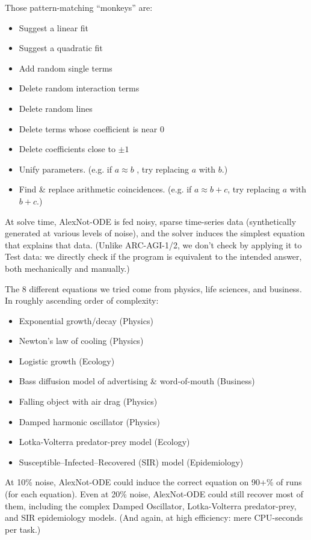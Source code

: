 \documentclass[11pt]{article}
\begin{document}
Those pattern-matching ``monkeys'' are:

\begin{itemize}
    \item Suggest a linear fit
    \item Suggest a quadratic fit
    \item Add random single terms
    \item Delete random interaction terms
    \item Delete random lines
    \item Delete terms whose coefficient is near 0
    \item Delete coefficients close to $\pm1$
    \item Unify parameters. (e.g. if $a \approx b$ , try replacing $a$ with $b$.)
    \item Find \& replace arithmetic coincidences. (e.g. if $a \approx b + c$, try replacing $a$ with $b + c$.)
\end{itemize}

At solve time, AlexNot-ODE is fed noisy, sparse time-series data (synthetically generated at various levels of noise), and the solver induces the simplest equation that explains that data. (Unlike ARC-AGI-1/2, we don't check by applying it to Test data: we directly check if the program is equivalent to the intended answer, both mechanically and manually.)

The 8 different equations we tried come from physics, life sciences, and business. In roughly ascending order of complexity:

\begin{itemize}
    \item Exponential growth/decay (Physics)
    \item Newton's law of cooling (Physics)
    \item Logistic growth (Ecology)
    \item Bass diffusion model of advertising \& word-of-mouth (Business)
    \item Falling object with air drag (Physics)
    \item Damped harmonic oscillator (Physics)
    \item Lotka-Volterra predator-prey model (Ecology)
    \item Susceptible–Infected–Recovered (SIR) model (Epidemiology)
\end{itemize}

At 10\% noise, AlexNot-ODE could induce the correct equation on 90+\% of runs (for each equation). Even at 20\% noise, AlexNot-ODE could still recover most of them, including the complex Damped Oscillator, Lotka-Volterra predator-prey, and SIR epidemiology models. (And again, at high efficiency: mere CPU-seconds per task.)
\end{document}
